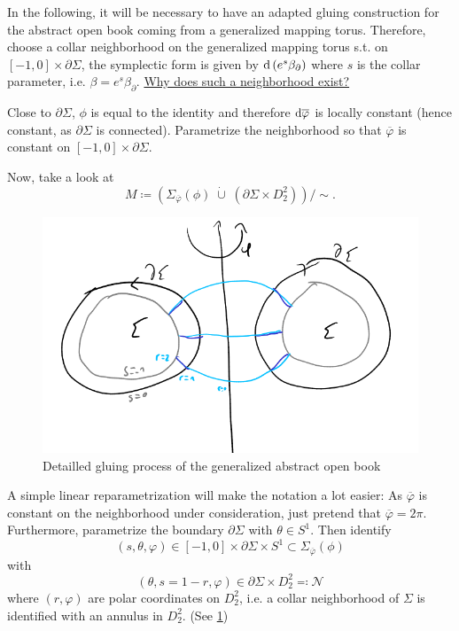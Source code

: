 In the following, it will be necessary to have an adapted gluing construction for the abstract open book coming from a generalized mapping torus.
Therefore, choose a collar neighborhood on the generalized mapping torus s.t. on $[-1,0] \times \partial \Sigma$, 
the symplectic form is given by $\mathrm{d} \left(e^s\beta_\partial\right)$ where $s$ is the collar parameter, i.e. $\beta = e^s\beta_\partial$.
\underline{Why does such a neighborhood exist?}

Close to $\partial \Sigma$, $\phi$ is equal to the identity and therefore $\mathrm{d} \overline{\varphi}$ is locally constant (hence constant, as $\partial \Sigma$ is connected).
Parametrize the neighborhood so that $\overline{\varphi}$ is constant on $[-1,0]\times \partial \Sigma$.

Now, take a look at
\[
    M \coloneqq \left(\Sigma_{\overline{\varphi}}(\phi)\; \dot\cup\; \left(\partial \Sigma \times D_2^2\right)\right)/\sim.
\]
\begin{figure}
    \includegraphics[width=\textwidth]{images/abstract_open_book_gluing.png}
    \caption[Gluing an abstract open book]{Detailled gluing process of the generalized abstract open book}
    \label{fig:abstract_open_book_gluing}
\end{figure}
A simple linear reparametrization will make the notation a lot easier: As $\overline{\varphi}$ is constant on the neighborhood under consideration, just pretend that $\overline{\varphi} = 2\pi$.
Furthermore, parametrize the boundary $\partial \Sigma$ with $\theta \in S^1$.
Then identify 
\[
    (s, \theta, \varphi) \in [-1,0] \times \partial \Sigma \times S^1 \subset \Sigma_{\overline{\varphi}}(\phi)
\]
with
\[
    (\theta, s = 1-r, \varphi) \in \partial \Sigma \times D_2^2 \eqqcolon \mathcal{N}
\]
where $(r, \varphi)$ are polar coordinates on $D_2^2$, i.e. a collar neighborhood of $\Sigma$ is identified with an annulus in $D_2^2$.
(See \cref{fig:abstract_open_book_gluing})

